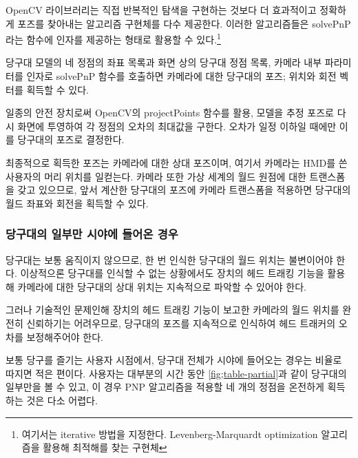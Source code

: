 \documentclass[10pt]{oblivoir}
\begin{document}
OpenCV 라이브러리는 직접 반복적인 탐색을 구현하는 것보다 더 효과적이고 정확하게 포즈를 찾아내는 알고리즘 구현체를 다수 제공한다. 이러한 알고리즘들은 solvePnP라는 함수에 인자를 제공하는 형태로 활용할 수 있다.\footnote{여기서는 iterative 방법을 지정한다. Levenberg-Marquardt optimization 알고리즘을 활용해 최적해를 찾는 구현체}

당구대 모델의 네 정점의 좌표 목록과 화면 상의 당구대 정점 목록, 카메라 내부 파라미터를 인자로 solve\-PnP 함수를 호출하면 카메라에 대한 당구대의 포즈; 위치와 회전 벡터를 획득할 수 있다.

일종의 안전 장치로써 OpenCV의 projectPoints 함수를 활용, 모델을 추정 포즈로 다시 화면에 투영하여 각 정점의 오차의 최대값을 구한다. 오차가 일정 이하일 때에만 이를 당구대의 포즈로 결정한다.

최종적으로 획득한 포즈는 카메라에 대한 상대 포즈이며, 여기서 카메라는 HMD를 쓴 사용자의 머리 위치를 일컫는다. 카메라 또한 가상 세계의 월드 원점에 대한 트랜스폼을 갖고 있으므로, 앞서 계산한 당구대의 포즈에 카메라 트랜스폼을 적용하면 당구대의 월드 좌표와 회전을 획득할 수 있다.

\subsubsection{당구대의 일부만 시야에 들어온 경우}

당구대는 보통 움직이지 않으므로, 한 번 인식한 당구대의 월드 위치는 불변이어야 한다. 이상적으론 당구대를 인식할 수 없는 상황에서도 장치의 헤드 트래킹 기능을 활용해 카메라에 대한 당구대의 상대 위치는 지속적으로 파악할 수 있어야 한다.

그러나 기술적인 문제 인해 장치의 헤드 트래킹 기능이 보고한 카메라의 월드 위치를 완전히 신뢰하기는 어려우므로, 당구대의 포즈를 지속적으로 인식하여 헤드 트래커의 오차를 보정해주어야 한다.

보통 당구를 즐기는 사용자 시점에서, 당구대 전체가 시야에 들어오는 경우는 비율로 따지면 적은 편이다. 사용자는 대부분의 시간 동안 \cref{fig;table-partial}과 같이 당구대의 일부만을 볼 수 있고, 이 경우 PNP 알고리즘을 적용할 네 개의 정점을 온전하게 획득하는 것은 다소 어렵다. 
\end{document}
